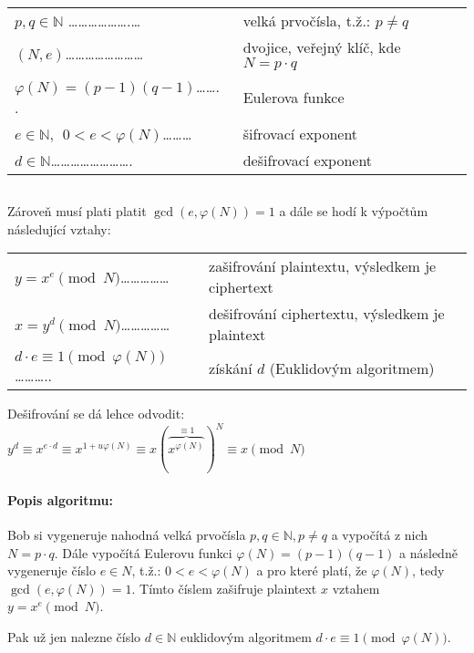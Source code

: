 \documentclass[10pt,a4paper]{article}
\newcommand{\N}{{\mathbb{N}}}       %
\begin{document}
\begin{tabular}{ll}
    $p, q \in \N$ \hphantom{1}\ldots\ldots\ldots\ldots\ldots\ldots .\ldots & velká prvočísla, t.ž.: $p\neq q$ \hphantom{2} \\
    $(N,e)$\hphantom{3}\ldots\ldots\ldots\ldots\ldots\ldots\ldots\ldots & dvojice, veřejný klíč, kde $N = p\cdot q$ \hphantom{4} \\
    $\varphi(N) = (p-1)(q-1)$\hphantom{5}\ldots\ldots. . & Eulerova funkce \hphantom{6} \\
    $e \in \N, ~~ 0<e<\varphi(N)$\hphantom{7}\ldots\ldots\ldots & šifrovací exponent \hphantom{8} \\
    $d \in \N$\hphantom{9}\ldots\ldots\ldots\ldots\ldots\ldots\ldots\ldots. & dešifrovací exponent \hphantom{10} \\
\end{tabular}

$ $

Zároveň musí plati platit $\gcd(e, \varphi(N))=1$ a dále se hodí k výpočtům následující vztahy:

\begin{tabular}{ll}
    $y = x^e \pmod N$\hphantom{1}\ldots\ldots\ldots\ldots\ldots & zašifrování plaintextu, výsledkem je ciphertext \hphantom{2} \\
    $x = y^d \pmod N$\hphantom{3}\ldots\ldots\ldots\ldots\ldots & dešifrování ciphertextu, výsledkem je plaintext \hphantom{4} \\
    $d\cdot e \equiv 1 \pmod{\varphi(N)}$\hphantom{5}\ldots\ldots\ldots .. & získání $d$ (Euklidovým algoritmem) \hphantom{6} \\
\end{tabular}


Dešifrování se dá lehce odvodit: $y^d \equiv x^{e\cdot d} \equiv x^{1 + u\varphi(N)}\equiv x(\overbrace{x^{\varphi(N)}}^{\equiv 1})^{N} \equiv x \pmod N$

\paragraph*{Popis algoritmu:}

Bob si vygeneruje nahodná velká prvočísla $p,q \in \N, p\neq q$ a vypočítá z nich $N=p\cdot q$. 
Dále vypočítá Eulerovu funkci $\varphi(N) = (p-1)(q-1)$ a následně vygeneruje číslo $e\in N$, t.ž.: $0<e<\varphi(N)$ a pro které platí, že $\varphi(N)$, tedy $\gcd(e, \varphi(N))=1$.
Tímto číslem zašifruje plaintext $x$ vztahem $y = x^e \pmod N$.

Pak už jen nalezne číslo $d \in \N$ euklidovým algoritmem $d\cdot e \equiv 1 \pmod{\varphi(N)}$.
\end{document}
